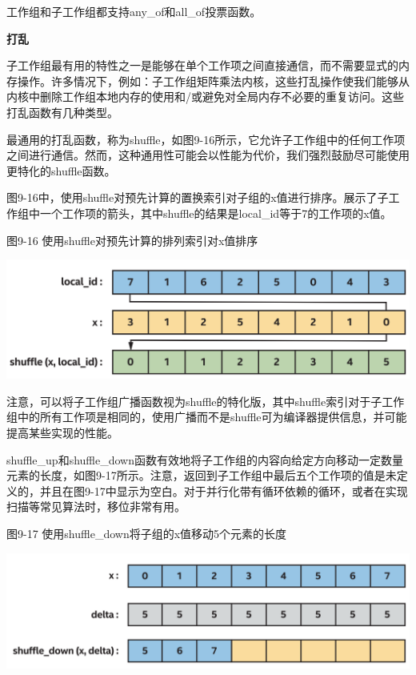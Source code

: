 工作组和子工作组都支持any\_of和all\_of投票函数。\par

\hspace*{\fill} \par %
\textbf{打乱}

子工作组最有用的特性之一是能够在单个工作项之间直接通信，而不需要显式的内存操作。许多情况下，例如：子工作组矩阵乘法内核，这些打乱操作使我们能够从内核中删除工作组本地内存的使用和/或避免对全局内存不必要的重复访问。这些打乱函数有几种类型。\par

最通用的打乱函数，称为shuffle，如图9-16所示，它允许子工作组中的任何工作项之间进行通信。然而，这种通用性可能会以性能为代价，我们强烈鼓励尽可能使用更特化的shuffle函数。\par

图9-16中，使用shuffle对预先计算的置换索引对子组的x值进行排序。展示了子工作组中一个工作项的箭头，其中shuffle的结果是local\_id等于7的工作项的x值。\par

\hspace*{\fill} \par %
图9-16 使用shuffle对预先计算的排列索引对x值排序
\begin{center}
	\includegraphics[width=1.\textwidth]{content/chapter-9/images/9}
\end{center}

注意，可以将子工作组广播函数视为shuffle的特化版，其中shuffle索引对于子工作组中的所有工作项是相同的，使用广播而不是shuffle可为编译器提供信息，并可能提高某些实现的性能。\par

shuffle\_up和shuffle\_down函数有效地将子工作组的内容向给定方向移动一定数量元素的长度，如图9-17所示。注意，返回到子工作组中最后五个工作项的值是未定义的，并且在图9-17中显示为空白。对于并行化带有循环依赖的循环，或者在实现扫描等常见算法时，移位非常有用。\par

\hspace*{\fill} \par %
图9-17 使用shuffle\_down将子组的x值移动5个元素的长度
\begin{center}
	\includegraphics[width=1.\textwidth]{content/chapter-9/images/10}
\end{center}

